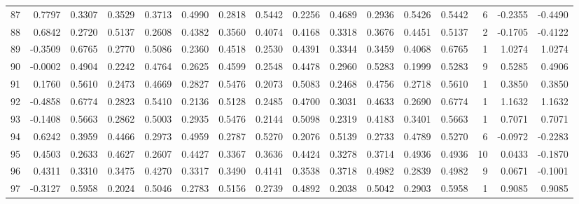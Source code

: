 \begin{tabular}{lrrrrrrrrrrrrrrr}
87  &      0.7797 &  0.3307 &  0.3529 &  0.3713 &  0.4990 &  0.2818 &  0.5442 &  0.2256 &  0.4689 &  0.2936 &   0.5426 &     0.5442 &      6 &                   -0.2355 &                    -0.4490 \\
88  &      0.6842 &  0.2720 &  0.5137 &  0.2608 &  0.4382 &  0.3560 &  0.4074 &  0.4168 &  0.3318 &  0.3676 &   0.4451 &     0.5137 &      2 &                   -0.1705 &                    -0.4122 \\
89  &     -0.3509 &  0.6765 &  0.2770 &  0.5086 &  0.2360 &  0.4518 &  0.2530 &  0.4391 &  0.3344 &  0.3459 &   0.4068 &     0.6765 &      1 &                    1.0274 &                     1.0274 \\
90  &     -0.0002 &  0.4904 &  0.2242 &  0.4764 &  0.2625 &  0.4599 &  0.2548 &  0.4478 &  0.2960 &  0.5283 &   0.1999 &     0.5283 &      9 &                    0.5285 &                     0.4906 \\
91  &      0.1760 &  0.5610 &  0.2473 &  0.4669 &  0.2827 &  0.5476 &  0.2073 &  0.5083 &  0.2468 &  0.4756 &   0.2718 &     0.5610 &      1 &                    0.3850 &                     0.3850 \\
92  &     -0.4858 &  0.6774 &  0.2823 &  0.5410 &  0.2136 &  0.5128 &  0.2485 &  0.4700 &  0.3031 &  0.4633 &   0.2690 &     0.6774 &      1 &                    1.1632 &                     1.1632 \\
93  &     -0.1408 &  0.5663 &  0.2862 &  0.5003 &  0.2935 &  0.5476 &  0.2144 &  0.5098 &  0.2319 &  0.4183 &   0.3401 &     0.5663 &      1 &                    0.7071 &                     0.7071 \\
94  &      0.6242 &  0.3959 &  0.4466 &  0.2973 &  0.4959 &  0.2787 &  0.5270 &  0.2076 &  0.5139 &  0.2733 &   0.4789 &     0.5270 &      6 &                   -0.0972 &                    -0.2283 \\
95  &      0.4503 &  0.2633 &  0.4627 &  0.2607 &  0.4427 &  0.3367 &  0.3636 &  0.4424 &  0.3278 &  0.3714 &   0.4936 &     0.4936 &     10 &                    0.0433 &                    -0.1870 \\
96  &      0.4311 &  0.3310 &  0.3475 &  0.4270 &  0.3317 &  0.3490 &  0.4141 &  0.3538 &  0.3718 &  0.4982 &   0.2839 &     0.4982 &      9 &                    0.0671 &                    -0.1001 \\
97  &     -0.3127 &  0.5958 &  0.2024 &  0.5046 &  0.2783 &  0.5156 &  0.2739 &  0.4892 &  0.2038 &  0.5042 &   0.2903 &     0.5958 &      1 &                    0.9085 &                     0.9085 \\

\end{tabular}
